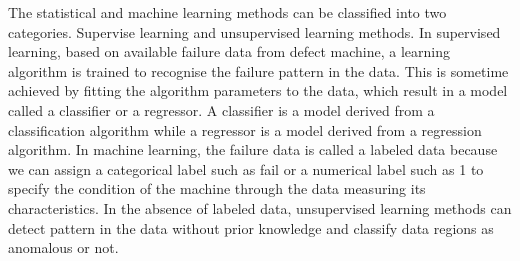 \documentclass[11pt, oneside]{article}   	%
\begin{document}
\begin{flushleft}
The statistical and machine learning methods can be classified into two categories. Supervise learning and unsupervised learning methods. In supervised learning, based on available failure data from defect machine, a learning algorithm is trained to recognise the failure pattern in the data. This is sometime achieved by fitting the algorithm parameters to the data, which result in a model called a classifier or a regressor. A classifier is a model derived from a classification algorithm while a regressor is a model derived from a regression algorithm. In machine learning, the failure data is called a labeled data because we can assign a categorical label such as fail or a numerical label such as 1 to specify the condition of the machine through the data measuring its characteristics. In the absence of labeled data, unsupervised learning methods can detect pattern in the data without prior knowledge and classify data regions as anomalous or not.
\end{flushleft}
\end{document}
